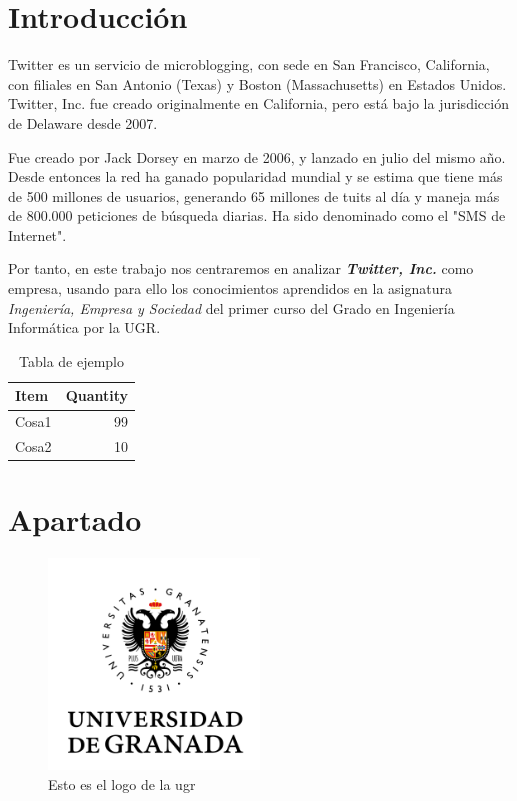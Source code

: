 \documentclass[12pt, spanish]{article}
\begin{document}

\tableofcontents
\pagebreak


\section{Introducción}

Twitter es un servicio de microblogging, con sede en San Francisco, California, con filiales en San Antonio (Texas) y Boston (Massachusetts) en Estados Unidos. Twitter, Inc. fue creado originalmente en California, pero está bajo la jurisdicción de Delaware desde 2007. 

Fue creado por Jack Dorsey en marzo de 2006, y lanzado en julio del mismo año. Desde entonces la red ha ganado popularidad mundial y se estima que tiene más de 500 millones de usuarios, generando 65 millones de tuits al día y maneja más de 800.000 peticiones de búsqueda diarias. Ha sido denominado como el "SMS de Internet".

Por tanto, en este trabajo nos centraremos en analizar \textbf{\textit{Twitter, Inc.}} como empresa, usando para ello los conocimientos aprendidos en la asignatura \textit{Ingeniería, Empresa y Sociedad} del primer curso del Grado en Ingeniería Informática por la UGR.

\begin{table}[!htb]
\centering
\begin{tabular}{l|r}
Item & Quantity \\\hline
Cosa1 & 99 \\
Cosa2 & 10
\end{tabular}
\caption{\label{tab:widgets}Tabla de ejemplo}
\end{table}

\newpage

\section{Apartado}

\begin{figure}[!htb]
\centering
\includegraphics[width=0.5\textwidth]{ugr.png}
\caption{\label{fig:frog}Esto es el logo de la ugr}
\end{figure}

\newpage





\end{document}
